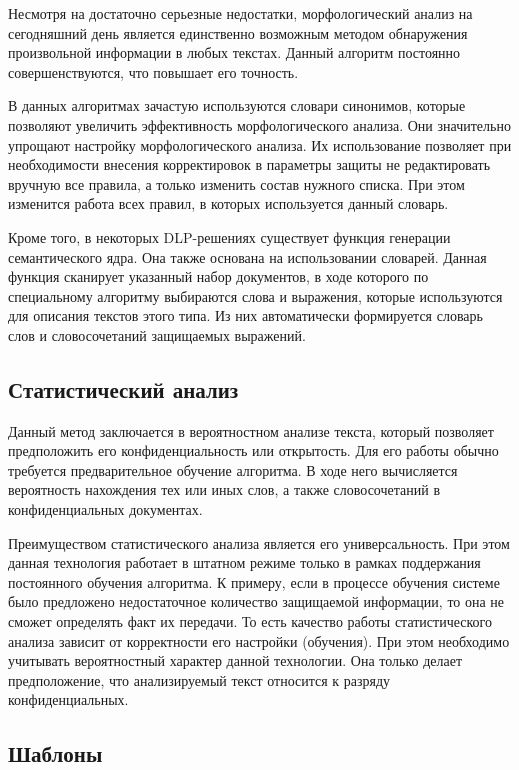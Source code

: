 Несмотря на достаточно серьезные недостатки, морфологический анализ на сегодняшний день является единственно возможным методом обнаружения произвольной информации в любых текстах. Данный алгоритм постоянно совершенствуются, что повышает его точность.

В данных алгоритмах зачастую используются словари синонимов, которые позволяют увеличить эффективность морфологического анализа. Они значительно упрощают настройку морфологического анализа. Их использование позволяет при необходимости внесения корректировок в параметры защиты не редактировать вручную все правила, а только изменить состав нужного списка. При этом изменится работа всех правил, в которых используется данный словарь.

Кроме того, в некоторых DLP-решениях существует функция генерации семантического ядра. Она также основана на использовании словарей. Данная функция сканирует указанный набор документов, в ходе которого по специальному алгоритму выбираются слова и выражения, которые используются для описания текстов этого типа. Из них автоматически формируется словарь слов и словосочетаний защищаемых выражений.

\subsection{Статистический анализ}

Данный метод заключается в вероятностном анализе текста, который позволяет предположить его конфиденциальность или открытость. Для его работы обычно требуется предварительное обучение алгоритма. В ходе него вычисляется вероятность нахождения тех или иных слов, а также словосочетаний в конфиденциальных документах.

Преимуществом статистического анализа является его универсальность. При этом данная технология работает в штатном режиме только в рамках поддержания постоянного обучения алгоритма. К примеру, если в процессе обучения системе было предложено недостаточное количество защищаемой информации, то она не сможет определять факт их передачи. То есть качество работы статистического анализа зависит от корректности его настройки (обучения). При этом необходимо учитывать вероятностный характер данной технологии. Она только делает предположение, что анализируемый текст относится к разряду конфиденциальных.

\subsection{Шаблоны}

